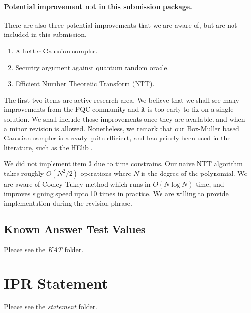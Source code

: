 \documentclass{llncs}
\newcommand{\<}{\langle}
\renewcommand{\>}{\rangle}
\begin{document}
\paragraph{Potential improvement not in this submission package.} 
There are also three potential improvements that we are aware of, but
are not included in this submission.
\begin{enumerate}
\item A better Gaussian sampler.
\item Security argument against quantum random oracle.
\item Efficient Number Theoretic Transform (NTT). 
\end{enumerate}
The first two items are active research area. We believe that we shall
see many improvements from the PQC community and it is too early to fix
on a single solution. We shall include those improvements once they are
available, and when a minor revision is allowed. Nonetheless, we remark
that our Box-Muller based Gaussian sampler is already quite efficient, 
and has priorly been used in the literature, such as the HElib \cite{DBLP:conf/crypto/HaleviS14}. 

We did not implement item 3 due to time constrains. Our naive
 NTT algorithm takes roughly $O(N^2/2)$ operations where $N$ is the degree
 of the polynomial. We are aware of Cooley-Tukey method which runs 
in $O(N\log N)$ time, and improves signing speed upto 10 times in practice.
We are willing to provide implementation during the revision phrase. 


\subsection{Known Answer Test Values}

Please see the {\em KAT} folder.


\section{IPR Statement}
Please see the {\em statement} folder.



\end{document}
